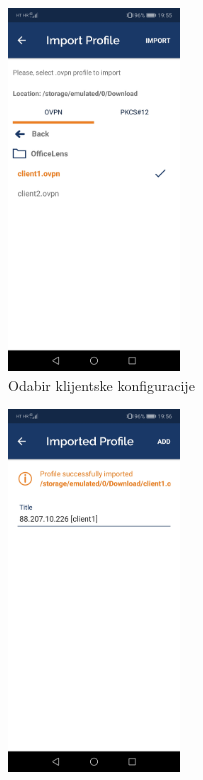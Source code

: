 \begin{figure}[!ht]
\begin{subfigure}{0.49\textwidth}
		\includegraphics[width = 0.5\textwidth]{slike/OpenVPN/Screenshot_20181214-195554}
		\caption{Odabir klijentske konfiguracije}
		\label{fig:screenshot20181214-195554}
	\end{subfigure}
	\begin{subfigure}{0.49\textwidth}
		\centering
		\includegraphics[width = 0.5\textwidth]{slike/OpenVPN/Screenshot_20181214-195602}

\end{subfigure}
\end{figure}
